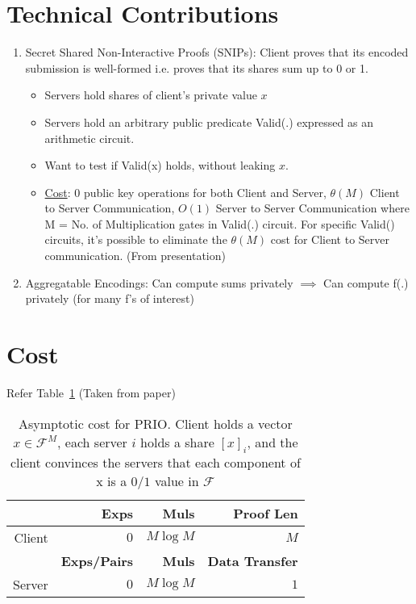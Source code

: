 \section{Technical Contributions}
\begin{enumerate}
    \item Secret Shared Non-Interactive Proofs (SNIPs): Client proves that its encoded submission is well-formed i.e. proves that its shares sum up to 0 or 1.
    \begin{itemize}
        \item Servers hold shares of client's private value $x$
        \item Servers hold an arbitrary public predicate Valid(.) expressed as an arithmetic circuit.
        \item Want to test if Valid(x) holds, without leaking $x$.
        \item \underline{Cost}: 0 public key operations for both Client and Server, $\theta(M)$ Client to Server Communication, $O(1)$ Server to Server Communication where M = No. of Multiplication gates in Valid(.) circuit. For specific Valid() circuits, it's possible to eliminate the $\theta(M)$ cost for Client to Server communication. (From presentation)
    \end{itemize}
    \item Aggregatable Encodings: Can compute sums privately $\implies$ Can compute f(.) privately (for many f's of interest)
\end{enumerate}

\section{Cost}
Refer Table~\ref{asymptoticcost} (Taken from paper)

\begin{table}
	\centering
	\begin{tabular}{ |r|r|r|r| } 
		\hline
		& \textbf{Exps} & \textbf{Muls} & \textbf{Proof Len} \\ \hline
		Client  & $0$ & $M \log M$ & $M$ \\ \hline
		& \textbf{Exps/Pairs} & \textbf{Muls} & \textbf{Data Transfer} \\ \hline
		Server  & $0$ & $M\log M$ & $1$ \\ \hline
	\end{tabular}
	\caption{Asymptotic cost for PRIO. Client holds a vector $x \in \mathcal{F}^M$, each server $i$ holds a share $[x]_i$, and the client convinces the servers that each component of x is a $0/1$ value in $\mathcal{F}$}
        \label{asymptoticcost}
\end{table}


